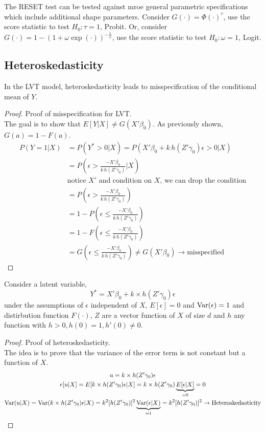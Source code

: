 The RESET test can be tested against mroe general parametric specifications which include additional shape parameters.
Consider $G(\cdot) = \Phi(\cdot)^\tau$, use the score statistic to test $H_0: \tau=1$, Probit. Or, consider $G(\cdot) = 1-(1+\omega\exp(\cdot))^{-\frac{1}{\omega}}$,
use the score statistic to test $H_0: \omega=1$, Logit.

\subsection{Heteroskedasticity}
In the LVT model, heteroskedasticity leads to misspecification of the conditional mean of $Y$.
\begin{proof}
    Proof of misspecification for LVT.\\
    The goal is to show that $E[Y|X] \neq G(X'\beta_0)$. As previously shown, $G(a) = 1 - F(a)$.
    \begin{align*}
        P(Y=1|X) & = P(Y^* > 0|X) = P(X'\beta_0+k\,h(Z'\gamma_0)\epsilon > 0|X)\\
        & = P\left(\epsilon > \frac{-X'\beta_0}{k\,h(Z'\gamma_0)}|X\right)\\
        & \text{notice $X'$ and condition on $X$, we can drop the condition}\\
        & = P\left(\epsilon > \frac{-X'\beta_0}{k\,h(Z'\gamma_0)}\right)\\
        & = 1 - P\left(\epsilon \leq \frac{-X'\beta_0}{k\,h(Z'\gamma_0)}\right)\\
        & = 1 - F\left(\epsilon \leq \frac{-X'\beta_0}{k\,h(Z'\gamma_0)}\right)\\
        & = G\left(\epsilon \leq \frac{-X'\beta_0}{k\,h(Z'\gamma_0)}\right) \neq G(X'\beta_0)\to \text{misspecified}
    \end{align*}
\end{proof}
Consider a latent variable, 
\begin{equation}
    Y^* = X'\beta_0 + k\times h(Z'\gamma_0)\epsilon
\end{equation}
under the assumptions of $\epsilon$ independent of $X$, $E[\epsilon]=0$ and $\operatorname{Var}(\epsilon)=1$ and distirbution function $F(\cdot)$, 
$Z$ are a vector function of $X$ of size $d$ and $h$ any function with $h>0, h(0) = 1, h'(0)\neq0$.
\begin{proof}
    Proof of heteroskedasticity.\\
    The idea is to prove that the variance of the error term is not constant but a function of $X$.
    \begin{gather*}
        u = k\times h(Z'\gamma_0)\epsilon\\
        e[u|X] = E[k\times h(Z'\gamma_0)\epsilon|X] = k\times h(Z'\gamma_0) \underbrace{E[\epsilon|X]}_{=0} = 0\\
        \operatorname{Var}(u|X) = \operatorname{Var}(k\times h(Z'\gamma_0)\epsilon|X) = k^2[h(Z'\gamma_0)]^2\underbrace{\operatorname{Var}(\epsilon|X)}_{=1} = k^2[h(Z'\gamma_0)]^2
        \to \text{Heteroskedasticity}
    \end{gather*}
\end{proof}

